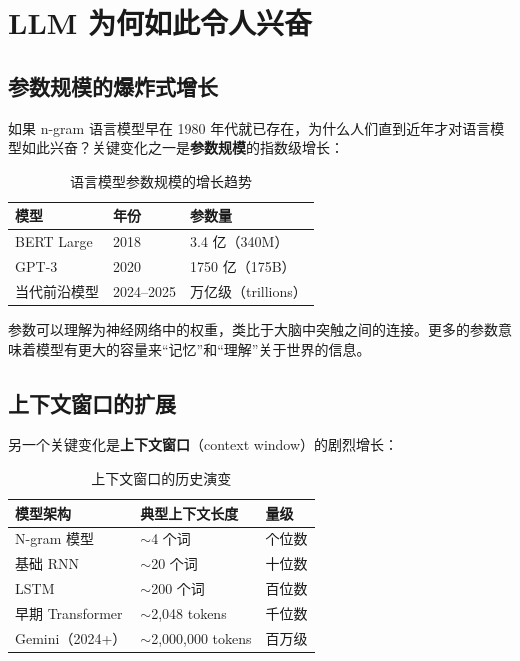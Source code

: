 \section{LLM 为何如此令人兴奋}

\subsection{参数规模的爆炸式增长}

如果 n-gram 语言模型早在 1980 年代就已存在，为什么人们直到近年才对语言模型如此兴奋？关键变化之一是\textbf{参数规模}的指数级增长：

\begin{table}[H]
\centering
\begin{tabular}{lll}
\toprule
\textbf{模型} & \textbf{年份} & \textbf{参数量} \\
\midrule
BERT Large     & 2018 & 3.4 亿（340M）  \\
GPT-3          & 2020 & 1750 亿（175B） \\
当代前沿模型   & 2024--2025 & 万亿级（trillions） \\
\bottomrule
\end{tabular}
\caption{语言模型参数规模的增长趋势}
\end{table}

参数可以理解为神经网络中的权重，类比于大脑中突触之间的连接。更多的参数意味着模型有更大的容量来``记忆''和``理解''关于世界的信息。

\subsection{上下文窗口的扩展}

另一个关键变化是\textbf{上下文窗口}（context window）的剧烈增长：

\begin{table}[H]
\centering
\begin{tabular}{lll}
\toprule
\textbf{模型架构} & \textbf{典型上下文长度} & \textbf{量级} \\
\midrule
N-gram 模型       & $\sim$4 个词          & 个位数 \\
基础 RNN           & $\sim$20 个词         & 十位数 \\
LSTM               & $\sim$200 个词        & 百位数 \\
早期 Transformer   & $\sim$2,048 tokens    & 千位数 \\
Gemini（2024+）    & $\sim$2,000,000 tokens & 百万级 \\
\bottomrule
\end{tabular}
\caption{上下文窗口的历史演变}
\end{table}

